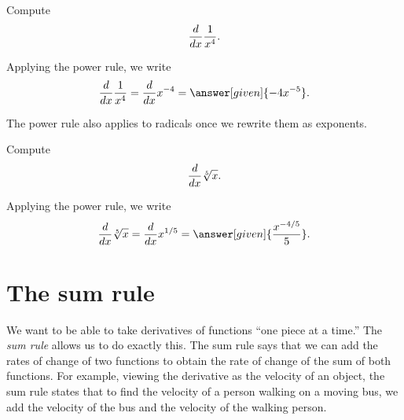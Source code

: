 \documentclass{ximera}
\begin{document}
\begin{example}
Compute
\[
\frac{d}{dx} \frac{1}{x^4}.
\]
\begin{explanation}
Applying the power rule, we write
\[
\ddx \frac{1}{x^4} = \ddx x^{-4} = \answer[given]{-4x^{-5}}.
\]
\end{explanation}
\end{example}

The power rule also applies to radicals once we rewrite them as exponents.

\begin{example}
Compute
\[
\frac{d}{dx} \sqrt[5]{x}.
\]
\begin{explanation}
Applying the power rule, we write
\[
\ddx \sqrt[5]{x} = \ddx x^{1/5} = \answer[given]{\frac{x^{-4/5}}{5}}.
\]
\end{explanation}
\end{example}






\section{The sum rule}

We want to be able to take derivatives of functions ``one piece at a
time.'' The \textit{sum rule} allows us to do exactly this. The sum rule says
that we can add the rates of change of two functions to obtain the
rate of change of the sum of both functions. For example, viewing the
derivative as the velocity of an object, the sum rule states that to find the
velocity of a person walking on a moving bus, we add the
velocity of the bus and the velocity of the walking person.
\end{document}
